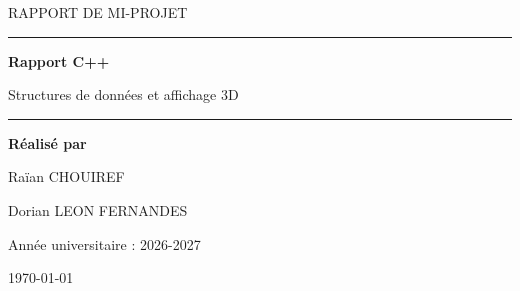 \documentclass[12pt,a4paper]{article}
\begin{document}
\begin{titlepage}
    \thispagestyle{empty}

    \centering

    \vspace*{2cm}

    {\Large\textcolor{gris}{RAPPORT DE MI-PROJET}\par}

    \vspace{1.5cm}

    {\color{bleufonce}\rule{\textwidth}{1.5pt}\par}

    \vspace{0.7cm}

    {\Huge\bfseries Rapport C++\par}

    \vspace{0.5cm}

    {\Large\textcolor{gris}{Structures de données et affichage 3D}\par}

    \vspace{0.7cm}

    {\color{bleufonce}\rule{\textwidth}{1.5pt}\par}

    \vspace{2.5cm}

    {\large\textbf{Réalisé par}\par}

    \vspace{0.5cm}

    {\Large Raïan CHOUIREF\par}
    \vspace{0.2cm}
    {\Large Dorian LEON FERNANDES\par}

    \vfill


    {\large Année universitaire : 2026-2027\par}

    \vspace{0.5cm}

    {\large \today\par}

    \vspace{1cm}

\end{titlepage}
\end{document}
